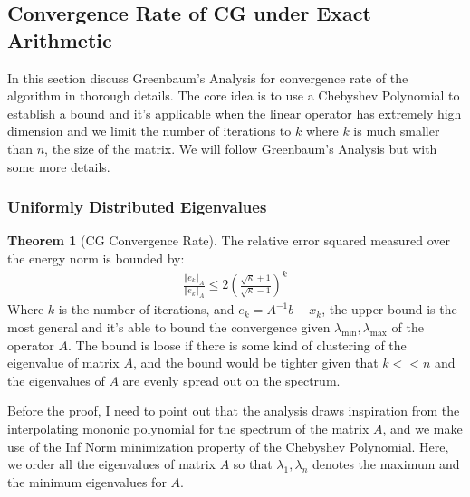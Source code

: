 \documentclass[]{article}
\theoremstyle{definition}
\newtheorem{theorem}{Theorem}            %
\begin{document}
    \subsection{Convergence Rate of CG under Exact Arithmetic}
        In this section discuss Greenbaum's Analysis for convergence rate of the algorithm\cite{book:greenbaum} in thorough details. The core idea is to use a Chebyshev Polynomial to establish a bound and it's applicable when the linear operator has extremely high dimension and we limit the number of iterations to $k$ where $k$ is much smaller than $n$, the size of the matrix. We will follow Greenbaum's Analysis but with some more details. 
        \subsubsection{Uniformly Distributed Eigenvalues}
            \begin{theorem}[CG Convergence Rate]\label{theorem:CG_Convergence_Rate}
                The relative error squared measured over the energy norm is bounded by: 
                \begin{align}
                    \frac{\Vert e_k\Vert_A}{\Vert e_k\Vert_A}
                    \le 2 \left(
                            \frac{\sqrt{\kappa} + 1}{\sqrt{\kappa} - 1}
                    \right)^k
                \end{align}
                Where $k$ is the number of iterations, and $e_k = A^{-1}b - x_k$, the upper bound is the most general and it's able to bound the convergence given $\lambda_{\min}, \lambda_{\max}$ of the operator $A$. The bound is loose if there is some kind of clustering of the eigenvalue of matrix $A$, and the bound would be tighter given that $k<<n$ and the eigenvalues of $A$ are evenly spread out on the spectrum. 
            \end{theorem}
            Before the proof, I need to point out that the analysis draws inspiration from the interpolating mononic polynomial for the spectrum of the matrix $A$, and we make use of the Inf Norm minimization property of the Chebyshev Polynomial. Here, we order all the eigenvalues of matrix $A$ so that $\lambda_1, \lambda_n$ denotes the maximum and the minimum eigenvalues for $A$. 
\end{document}
